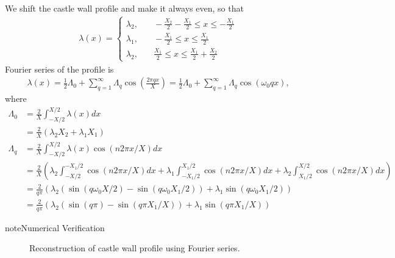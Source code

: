 \documentclass[letterpaper,12pt,english]{sphinxmanual}
\begin{document}
We shift the castle wall profile and make it always even, so that
\begin{equation*}
\begin{split}\lambda(x) = \begin{cases} \lambda_2 , &\quad -\frac{X_2}{2}-\frac{X_1}{2}\le x\le -\frac{X_1}{2} \\
\lambda_1, &\quad -\frac{X_1}{2}\le x\le \frac{X_1}{2} \\
\lambda_2, &\quad \frac{X_1}{2}\le x\le \frac{X_1}{2}+\frac{X_2}{2}
\end{cases}\end{split}
\end{equation*}
Fourier series of the profile is
\begin{equation*}
\begin{split}\lambda(x) = \frac{1}{2}\Lambda_0 + \sum_{q=1}^{\infty} \Lambda_q \cos\left( \frac{ 2\pi q x}{X} \right) = \frac{1}{2} \Lambda_0 + \sum_{q=1}^{\infty} \Lambda_q \cos\left( \omega_0 q x \right),\end{split}
\end{equation*}
where
\begin{equation*}
\begin{split}\Lambda_0 &= \frac{2}{X} \int^{X/2}_{-X/2} \lambda(x) d x \\
& = \frac{2}{X} \left(  \lambda_2 X_2 + \lambda_1 X_1   \right) \\
\Lambda_q &= \frac{2}{X} \int_{-X/2}^{X/2} \lambda(x) \cos(n 2\pi x/X)dx \\
& = \frac{2}{X} \left( \lambda_2 \int_{-X/2}^{-X_1/2} \cos(n 2\pi x/X)dx + \lambda_1 \int_{-X_1/2}^{X_1/2} \cos(n 2\pi x/X)dx + \lambda_2 \int_{X_1/2}^{X/2} \cos(n 2\pi x/X)dx \right) \\
& = \frac{2}{q\pi} \left( \lambda_2\left( \sin(q\omega_0 X/2) - \sin(q\omega_0 X_1/2) \right) + \lambda_1 \sin( q\omega_0 X_1/2)  \right)  \\
& = \frac{2}{q\pi} \left( \lambda_2\left( \sin(q \pi ) - \sin(q \pi X_1/X) \right) + \lambda_1 \sin( q\pi X_1/X)  \right)\end{split}
\end{equation*}
\begin{sphinxadmonition}{note}{Numerical Verification}
\begin{figure}[htbp]
\centering
\capstart

\noindent{}
\caption{Reconstruction of castle wall profile using Fourier series.}\label{\detokenize{matter-stimulated/parametric-resonance-revisted:parametric-resonance-reconstruction-of-even-castle-wall-0point01-0point02-1-1point8}}\label{\detokenize{matter-stimulated/parametric-resonance-revisted:id5}}\end{figure}
\end{sphinxadmonition}
\end{document}
